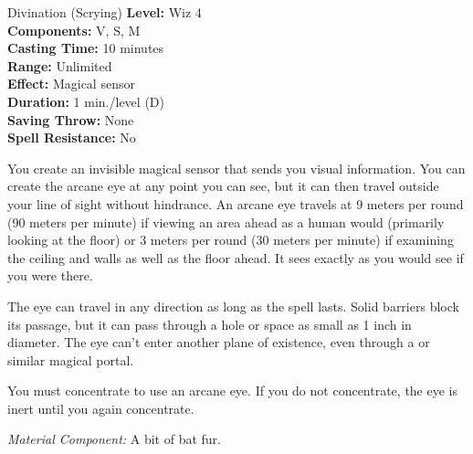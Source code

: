 {Divination (Scrying)}
{
	\textbf{Level:}
	Wiz 4\\
	\textbf{Components:}
	V, S, M\\
	\textbf{Casting Time:}
	10 minutes\\
	\textbf{Range:}
	Unlimited\\
	\textbf{Effect:}
	Magical sensor\\
	\textbf{Duration:}
	1 min./level (D)\\
	\textbf{Saving Throw:}
	None\\
	\textbf{Spell Resistance:}
	No\\
}
{
	You create an invisible magical sensor that sends you visual information. You can create the arcane eye at any point you can see, but it can then travel outside your line of sight without hindrance. An arcane eye travels at 9 meters per round (90 meters per minute) if viewing an area ahead as a human would (primarily looking at the floor) or 3 meters per round (30 meters per minute) if examining the ceiling and walls as well as the floor ahead. It sees exactly as you would see if you were there.

	The eye can travel in any direction as long as the spell lasts. Solid barriers block its passage, but it can pass through a hole or space as small as 1 inch in diameter. The eye can't enter another plane of existence, even through a  or similar magical portal.

	You must concentrate to use an arcane eye. If you do not concentrate, the eye is inert until you again concentrate.

	\textit{Material Component:}
	A bit of bat fur.

}
